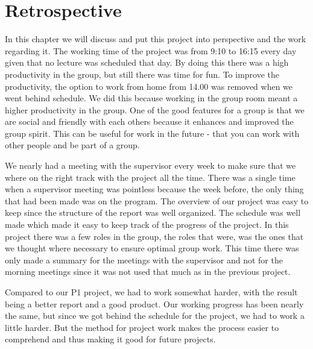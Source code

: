 \chapter{Retrospective}
In this chapter we will discuss and put this project into perspective and the work regarding it.
The working time of the project was from 9:10 to 16:15 every day given that no lecture was scheduled that day. By doing this there was a high productivity in the group, but still there was time for fun. To improve the productivity, the option to work from home from 14.00 was removed when we went behind schedule.
We did this because working in the group room meant a higher productivity in the group. One of the good features for a group is that we are social and friendly with each others because it enhances and improved the group spirit. This can be useful for work in the future - that you can work with other people and be part of a group.

We nearly had a meeting with the supervisor every week to make sure that we where on the right track with the project all the time. There was a single time when a supervisor meeting was pointless because the week before, the only thing that had been made was on the program. The overview of our project was easy to keep since the structure of the report was well organized. The schedule was well made which made it easy to keep track of the progress of the project. In this project there was a few roles in the group, the roles that were, was the ones that we thought where necessary to ensure optimal group work. This time there was only made a summary for the meetings with the supervisor and not for the morning meetings since it was not used that much as in the previous project. 

Compared to our P1 project, we had to work somewhat harder, with the result being a better report and a good product. Our working progress has been nearly the same, but since we got behind the schedule for the project, we had to work a little harder. But the method for project work makes the process easier to comprehend and thus making it good for future projects.